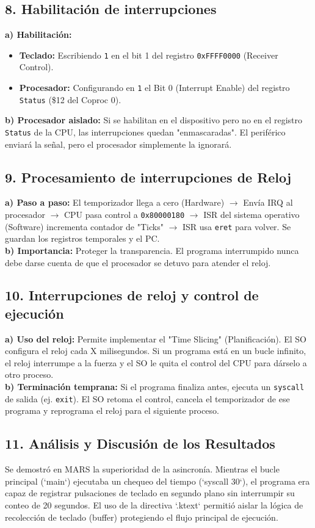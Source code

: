 \documentclass[12pt, a4paper]{article}
\begin{document}
\subsection{8. Habilitación de interrupciones}
\textbf{a) Habilitación:}
\begin{itemize}
    \item \textbf{Teclado:} Escribiendo \texttt{1} en el bit 1 del registro \texttt{0xFFFF0000} (Receiver Control).
    \item \textbf{Procesador:} Configurando en \texttt{1} el Bit 0 (Interrupt Enable) del registro \texttt{Status} (\$12 del Coproc 0).
\end{itemize}
\textbf{b) Procesador aislado:} Si se habilitan en el dispositivo pero no en el registro \texttt{Status} de la CPU, las interrupciones quedan "enmascaradas". El periférico enviará la señal, pero el procesador simplemente la ignorará.

\subsection{9. Procesamiento de interrupciones de Reloj}
\textbf{a) Paso a paso:} El temporizador llega a cero (Hardware) $\rightarrow$ Envía IRQ al procesador $\rightarrow$ CPU pasa control a \texttt{0x80000180} $\rightarrow$ ISR del sistema operativo (Software) incrementa contador de "Ticks" $\rightarrow$ ISR usa \texttt{eret} para volver. Se guardan los registros temporales y el PC.\\
\textbf{b) Importancia:} Proteger la transparencia. El programa interrumpido nunca debe darse cuenta de que el procesador se detuvo para atender el reloj.

\subsection{10. Interrupciones de reloj y control de ejecución}
\textbf{a) Uso del reloj:} Permite implementar el "Time Slicing" (Planificación). El SO configura el reloj cada X milisegundos. Si un programa está en un bucle infinito, el reloj interrumpe a la fuerza y el SO le quita el control del CPU para dárselo a otro proceso.\\
\textbf{b) Terminación temprana:} Si el programa finaliza antes, ejecuta un \texttt{syscall} de salida (ej. \texttt{exit}). El SO retoma el control, cancela el temporizador de ese programa y reprograma el reloj para el siguiente proceso.

\subsection{11. Análisis y Discusión de los Resultados}
Se demostró en MARS la superioridad de la asincronía. Mientras el bucle principal (`main`) ejecutaba un chequeo del tiempo (`syscall 30`), el programa era capaz de registrar pulsaciones de teclado en segundo plano sin interrumpir su conteo de 20 segundos. El uso de la directiva `.ktext` permitió aislar la lógica de recolección de teclado (buffer) protegiendo el flujo principal de ejecución.
\end{document}
